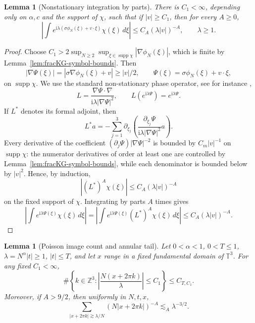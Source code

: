 \documentclass[10pt]{amsart}
\numberwithin{equation}{section}
\theoremstyle{plain}
\newtheorem{lemma}[theorem]{Lemma}
\theoremstyle{definition}
\theoremstyle{remark}
\newcommand{\ii}{\mathrm{i}}
\DeclareMathOperator{\supp}{supp}
\begin{document}
\begin{lemma}[Nonstationary integration by parts]\label{lem:fracKG-nonstationary}
There is $C_1<\infty$, depending only on $\alpha,c$ and the support of $\chi$, such that if $|v|\ge C_1$, then for every $A\ge0$,
\[
        \left|\int e^{\ii\lambda(\sigma\phi_N(\xi)+v\cdot\xi)}\chi(\xi)\,d\xi\right|
        \le C_A(\lambda|v|)^{-A},
        \qquad \lambda\ge1.
\]
\end{lemma}

\begin{proof}
Choose $C_1>2\sup_{N\ge2}\sup_{\xi\in\supp\chi}|\nabla\phi_N(\xi)|$, which is finite by Lemma~\ref{lem:fracKG-symbol-bounds}.  Then
\[
        |\nabla\Psi(\xi)|
        =|\sigma\nabla\phi_N(\xi)+v|
        \ge |v|/2,
        \qquad \Psi(\xi)=\sigma\phi_N(\xi)+v\cdot\xi,
\]
on $\supp\chi$.  We use the standard non-stationary phase operator, see for instance \cite[Chapter VIII]{SteinHarmonic},
\[
        L=\frac{\nabla\Psi\cdot\nabla}{\ii\lambda|\nabla\Psi|^2},
        \qquad L(e^{\ii\lambda\Psi})=e^{\ii\lambda\Psi}.
\]
If $L^*$ denotes its formal adjoint, then
\[
        L^*a
        =-\sum_{j=1}^3\partial_{\xi_j}\left(
        \frac{\partial_{\xi_j}\Psi}{\ii\lambda|\nabla\Psi|^2}a\right).
\]
Every derivative of the coefficient $(\partial_j\Psi)|\nabla\Psi|^{-2}$ is bounded by $C_m|v|^{-1}$ on $\supp\chi$: the numerator derivatives of order at least one are controlled by Lemma~\ref{lem:fracKG-symbol-bounds}, while each denominator is bounded below by $|v|^2$.  Hence, by induction,
\[
        |(L^*)^A\chi(\xi)|\le C_A(\lambda |v|)^{-A}
\]
on the fixed support of $\chi$.  Integrating by parts $A$ times gives
\[
        \left|\int e^{\ii\lambda\Psi(\xi)}\chi(\xi)\,d\xi\right|
        =\left|\int e^{\ii\lambda\Psi(\xi)}(L^*)^A\chi(\xi)\,d\xi\right|
        \le C_A(\lambda|v|)^{-A}.
\]

\end{proof}

\begin{lemma}[Poisson image count and annular tail]\label{lem:fracKG-poisson-image-count}
Let $0<\alpha<1$, $0<T\le1$, $\lambda=N^\alpha|t|\ge1$, $|t|\le T$, and let $x$ range in a fixed fundamental domain of $\mathbb T^3$.  For any fixed $C_1<\infty$,
\[
  \#\left\{k\in\mathbb Z^3:
       \left|\frac{N(x+2\pi k)}{\lambda}\right|\le C_1\right\}
  \le C_{T,C_1}.
\]
Moreover, if $A>9/2$, then uniformly in $N,t,x$,
\begin{equation}\label{eq:poisson-tail-annuli}
  \sum_{|x+2\pi k|\gtrsim \lambda/N}
       (N|x+2\pi k|)^{-A}
  \lesssim_A \lambda^{-3/2}.
\end{equation}
\end{lemma}
\end{document}
